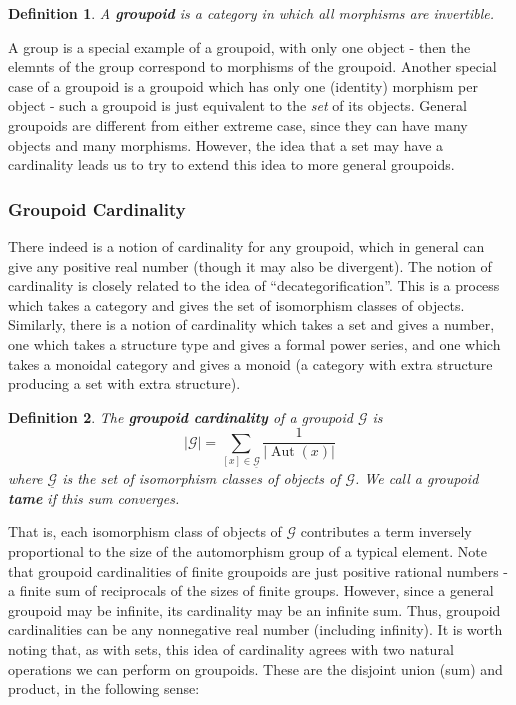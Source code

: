 \documentclass{amsart} \usepackage{amsmath,amssymb,bbm}
\newcommand{\opname}[1]{\operatorname{#1}}
\newtheorem{definition}{Definition}
\begin{document}
\begin{definition}
  A {\textbf{groupoid}} is a category in which all morphisms are
  invertible.
\end{definition}

A group is a special example of a groupoid, with only one object -
then the elemnts of the group correspond to morphisms of the groupoid.
Another special case of a groupoid is a groupoid which has only one
(identity) morphism per object - such a groupoid is just equivalent to
the \textit{set} of its objects.  General groupoids are different from
either extreme case, since they can have many objects and many
morphisms.  However, the idea that a set may have a cardinality leads
us to try to extend this idea to more general groupoids.

\subsubsection{Groupoid Cardinality}

There indeed is a notion of cardinality for any groupoid, which in
general can give any positive real number (though it may also be
divergent). The notion of cardinality is closely related to the idea
of ``decategorification''.  This is a process which takes a category
and gives the set of isomorphism classes of objects.  Similarly, there
is a notion of cardinality which takes a set and gives a number, one
which takes a structure type and gives a formal power series, and one
which takes a monoidal category and gives a monoid (a category with
extra structure producing a set with extra structure).

\begin{definition}
  The {\textbf{groupoid cardinality}} of a groupoid $\mathcal{G}$ is
  \begin{equation}
   |\mathcal{G}| = \sum_{[ x ] \in \underline{\mathcal{G}}} \frac{1}{|
     \opname{Aut} ( x ) |}
  \end{equation}
  where $\underline{\mathcal{G}}$ is the set of isomorphism classes of objects of
  $\mathcal{G}$.  We call a groupoid {\textbf{tame}} if this sum converges.
\end{definition}

That is, each isomorphism class of objects of $\mathcal{G}$
contributes a term inversely proportional to the size of the
automorphism group of a typical element.  Note that groupoid
cardinalities of finite groupoids are just positive rational numbers -
a finite sum of reciprocals of the sizes of finite groups.  However,
since a general groupoid may be infinite, its cardinality may be an
infinite sum. Thus, groupoid cardinalities can be any nonnegative real
number (including infinity).  It is worth noting that, as with sets,
this idea of cardinality agrees with two natural operations we can
perform on groupoids.  These are the disjoint union (sum) and product,
in the following sense:
\end{document}
